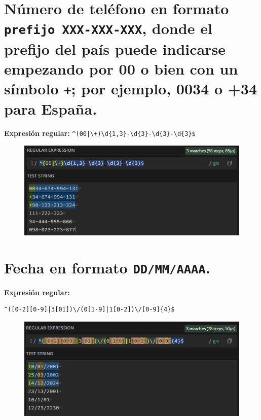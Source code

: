\documentclass[11pt]{report}
\begin{document}
\section{Número de teléfono en formato \texttt{prefijo XXX-XXX-XXX}, donde el prefijo del país puede indicarse empezando por 00 o bien con un símbolo \texttt{+}; por ejemplo, 0034 o +34 para España.}
\textbf{Expresión regular:} \texttt{\textasciicircum(00|\textbackslash+)\textbackslash d\{1,3\}-\textbackslash d\{3\}-\textbackslash d\{3\}-\textbackslash d\{3\}\$}
  \begin{figure}[H]
    \centering
    \includegraphics[scale=0.75]{img/op_extendidos_07.png}
  \end{figure}

\section{Fecha en formato \texttt{DD/MM/AAAA}.}
\textbf{Expresión regular:}
\begin{verbatim}
^([0-2][0-9]|3[01])\/(0[1-9]|1[0-2])\/[0-9]{4}$
\end{verbatim}
  \begin{figure}[H]
    \centering
    \includegraphics[scale=0.75]{img/op_extendidos_08.png}
  \end{figure}

\newpage
\end{document}
